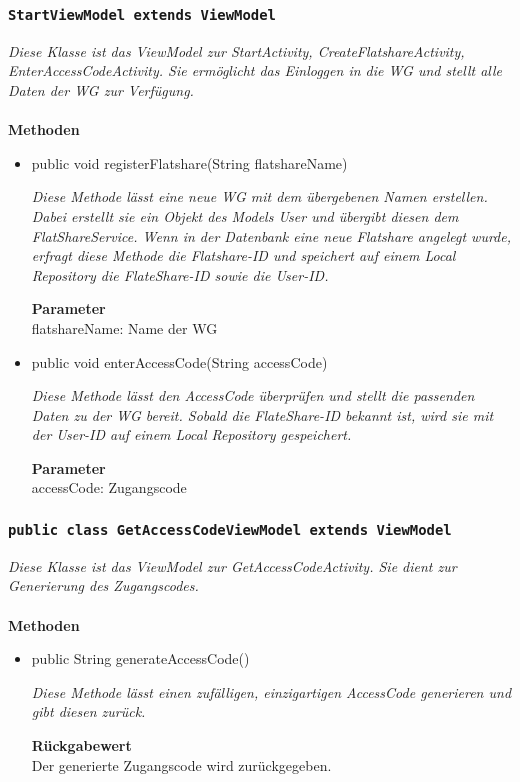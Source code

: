              	\subsubsection{\texttt{StartViewModel extends ViewModel}}
        \textit{Diese Klasse ist das ViewModel zur StartActivity, CreateFlatshareActivity, EnterAccessCodeActivity. Sie ermöglicht das Einloggen in die WG und stellt alle Daten der WG zur Verfügung.}\\
        \\
		\textbf{Methoden} \\
 			\begin{itemize}
        		\item{public void registerFlatshare(String flatshareName)}
        	
        		\textit{Diese Methode lässt eine neue WG mit dem übergebenen Namen erstellen. Dabei erstellt sie ein Objekt des Models User und übergibt diesen dem FlatShareService. Wenn in der Datenbank eine neue Flatshare angelegt wurde, erfragt diese Methode die Flatshare-ID und speichert auf einem Local Repository die FlateShare-ID sowie die User-ID.}
        	
        		\textbf{Parameter} \\
				flatshareName: Name der WG


        		\item{public void enterAccessCode(String accessCode)}
        	
        		\textit{Diese Methode lässt den AccessCode überprüfen und stellt die passenden Daten zu der WG bereit. Sobald die FlateShare-ID bekannt ist, wird sie mit der User-ID auf einem Local Repository gespeichert.}
        	
        		\textbf{Parameter} \\
				accessCode: Zugangscode
   
       		 \end{itemize}
             
             		\subsubsection{\texttt{public class GetAccessCodeViewModel extends ViewModel}}
        \textit{Diese Klasse ist das ViewModel zur GetAccessCodeActivity. Sie dient zur Generierung des Zugangscodes.}\\
        \\
		\textbf{Methoden} \\
 			\begin{itemize}
        		\item{public String generateAccessCode()}
        	
        		\textit{Diese Methode lässt einen zufälligen, einzigartigen AccessCode generieren und gibt diesen zurück.}
        	
        		\textbf{Rückgabewert} \\
				Der generierte Zugangscode wird zurückgegeben.
   
       		 \end{itemize}
             
